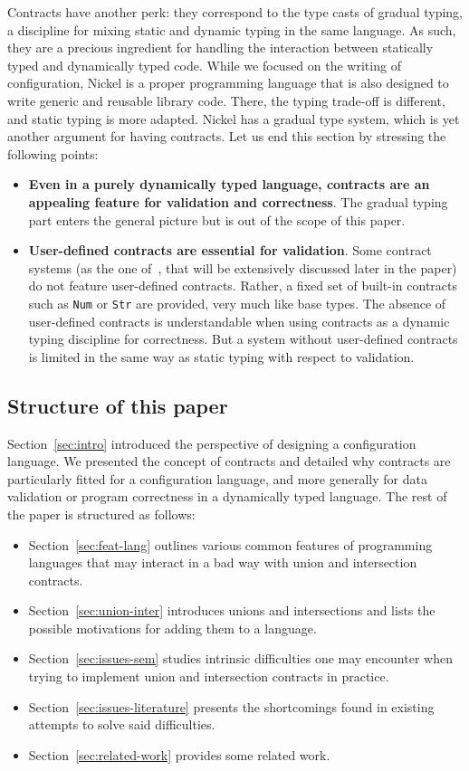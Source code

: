 \documentclass[sigplan,10pt,review,anonymous]{acmart}
\newcommand{\nickel}[1]{\lstinline[language=nickel]{#1}}
\begin{document}
Contracts have another perk: they correspond to the type casts of gradual
typing, a discipline for mixing static and dynamic typing in the same language.
As such, they are a precious ingredient for handling the interaction between 
statically typed and dynamically typed code. While we focused on the writing of
configuration, Nickel is a proper programming language that is also designed to
write generic and reusable library code. There, the typing trade-off is
different, and static typing is more adapted. Nickel has a gradual type system,
which is yet another argument for having contracts. Let us end this section by
stressing the following points:
\begin{itemize}
    \item \textbf{Even in a purely dynamically typed language, contracts are an
        appealing feature for validation and correctness}. The gradual typing
        part enters the general picture but is out of the scope of this paper.
    \item \textbf{User-defined contracts are essential for validation}. Some
        contract systems (as the one of~\cite{RootCauseOfBlame}, that will be
        extensively discussed later in the paper) do not feature user-defined
        contracts.  Rather, a fixed set of built-in contracts such as
        \nickel{Num} or \nickel{Str} are provided, very much like base
        types. The absence of user-defined contracts is understandable when
        using contracts as a dynamic typing discipline for correctness. But a
        system without user-defined contracts is limited in the same way as
        static typing with respect to validation.
\end{itemize}

\subsection*{Structure of this paper}
Section~\ref{sec:intro} introduced the perspective of designing a configuration
language. We presented the concept of contracts and detailed why contracts are
particularly fitted for a configuration language, and more generally for data
validation or program correctness in a dynamically typed language. The rest of
the paper is structured as follows:
\begin{itemize}
    \item Section~\ref{sec:feat-lang} outlines various common features of
        programming languages that may interact in a bad way with union and
        intersection contracts.
    \item Section~\ref{sec:union-inter} introduces unions and intersections and
        lists the possible motivations for adding them to a language.
    \item Section~\ref{sec:issues-sem} studies intrinsic difficulties one may
        encounter when trying to implement union and intersection contracts in
        practice.
    \item Section~\ref{sec:issues-literature} presents the shortcomings found in
        existing attempts to solve said difficulties.
    \item Section~\ref{sec:related-work} provides some related work.
\end{itemize}
\end{document}

